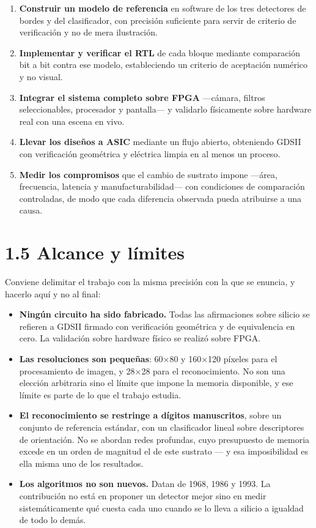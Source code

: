 \begin{enumerate}
\def\labelenumi{\arabic{enumi}.}
\item
  \textbf{Construir un modelo de referencia} en software de los tres
  detectores de bordes y del clasificador, con precisión suficiente para
  servir de criterio de verificación y no de mera ilustración.
\item
  \textbf{Implementar y verificar el RTL} de cada bloque mediante
  comparación bit a bit contra ese modelo, estableciendo un criterio de
  aceptación numérico y no visual.
\item
  \textbf{Integrar el sistema completo sobre FPGA} ---cámara, filtros
  seleccionables, procesador y pantalla--- y validarlo físicamente sobre
  hardware real con una escena en vivo.
\item
  \textbf{Llevar los diseños a ASIC} mediante un flujo abierto,
  obteniendo GDSII con verificación geométrica y eléctrica limpia en al
  menos un proceso.
\item
  \textbf{Medir los compromisos} que el cambio de sustrato impone
  ---área, frecuencia, latencia y manufacturabilidad--- con condiciones
  de comparación controladas, de modo que cada diferencia observada
  pueda atribuirse a una causa.
\end{enumerate}

\section{1.5 Alcance y límites}\label{alcance-y-luxedmites}

Conviene delimitar el trabajo con la misma precisión con la que se
enuncia, y hacerlo aquí y no al final:

\begin{itemize}
\tightlist
\item
  \textbf{Ningún circuito ha sido fabricado.} Todas las afirmaciones
  sobre silicio se refieren a GDSII firmado con verificación geométrica
  y de equivalencia en cero. La validación sobre hardware físico se
  realizó sobre FPGA.
\item
  \textbf{Las resoluciones son pequeñas}: 60×80 y 160×120 píxeles para
  el procesamiento de imagen, y 28×28 para el reconocimiento. No son una
  elección arbitraria sino el límite que impone la memoria disponible, y
  ese límite es parte de lo que el trabajo estudia.
\item
  \textbf{El reconocimiento se restringe a dígitos manuscritos}, sobre
  un conjunto de referencia estándar, con un clasificador lineal sobre
  descriptores de orientación. No se abordan redes profundas, cuyo
  presupuesto de memoria excede en un orden de magnitud el de este
  sustrato --- y esa imposibilidad es ella misma uno de los resultados.
\item
  \textbf{Los algoritmos no son nuevos.} Datan de 1968, 1986 y 1993. La
  contribución no está en proponer un detector mejor sino en medir
  sistemáticamente qué cuesta cada uno cuando se lo lleva a silicio a
  igualdad de todo lo demás.
\end{itemize}

